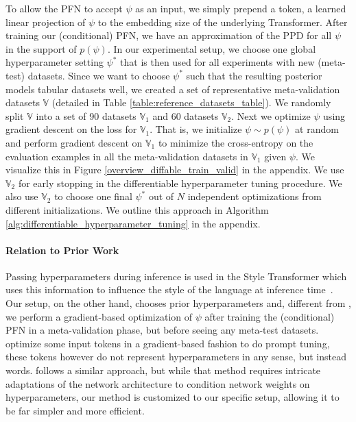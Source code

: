 \documentclass{article}
\begin{document}
%
To allow the PFN to accept $\psi$ as an input, we simply prepend a token, a learned linear projection of $\psi$ to the embedding size of the underlying Transformer.
After training our (conditional) PFN, we have an approximation of the PPD for all $\psi$ in the support of $p(\psi)$.
In our experimental setup, we choose one global hyperparameter setting $\psi^*$ that is then used for all experiments with new (meta-test) datasets.
Since we want to choose $\psi^*$ such that the resulting posterior models tabular datasets well, 
\newcommand{\V}[0]{\mathbb{V}}
we created a set of representative meta-validation datasets $\V$ (detailed in Table \ref{table:reference_datasets_table}). We randomly split $\V$ into a set of 90 datasets $\V_1$ and 60 datasets $\V_2$. Next we optimize $\psi$ using gradient descent on the loss for $\V_1$. That is, we initialize $\psi \sim p(\psi)$ at random and perform gradient descent on $\V_1$ to minimize the cross-entropy on the evaluation examples in all the meta-validation datasets in $\V_1$ given $\psi$.
We visualize this in Figure \ref{overview_diffable_train_valid} in the appendix.
We use $\V_2$ for early stopping in the differentiable hyperparameter tuning procedure. We also use $\V_2$ to choose one final $\psi^*$ out of $N$ independent optimizations from different initializations.
We outline this approach in Algorithm \ref{alg:differentiable_hyperparameter_tuning} in the appendix.

\paragraph{Relation to Prior Work}
Passing hyperparameters during inference is used in the Style Transformer which uses this information to influence the style of the language at inference time~\citep{styletransformer}.
Our setup, on the other hand, chooses prior hyperparameters and, different from \citet{styletransformer}, we perform a gradient-based optimization of $\psi$ after training the (conditional) PFN in a meta-validation phase, but before seeing any meta-test datasets.
\citet{zhang2022differentiableprompt} optimize some input tokens in a gradient-based fashion to do prompt tuning, these tokens however do not represent hyperparameters in any sense, but instead words.
\citet{mackay2019self} follows a similar approach, but while that method requires intricate adaptations of the network architecture to condition network weights on hyperparameters, our method 
is customized to our specific setup, allowing it to be far simpler and more efficient. 
\fi
\end{document}

